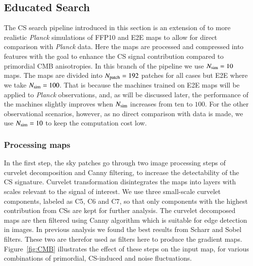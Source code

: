 \documentclass[fleqn,usenatbib]{mnras}
\begin{document}
\subsection{Educated Search}
\label{sec:edu}

 The CS search pipeline introduced in this section is an extension of \cite{vaf17,vafaei2021clustering} to more realistic {\it Planck} simulations of FFP10 and E2E maps to allow for direct comparison with {\it Planck} data. 
 Here the maps are processed and  compressed into features with the goal to  enhance the CS signal contribution compared to primordial CMB anisotropies. 
In this branch of the pipeline we use $N_{\rm sim}=10$ maps.
 The maps are divided into $N_{\rm patch}=192$ patches for all cases but E2E where we take $N_{\rm sim}=100$. 
That is because the machines trained on E2E maps will be applied to {\it Planck} observations, and,  as will be discussed later,  the performance of the machines  slightly improves when $N_{\rm sim}$ increases from ten to $100$. 
For the other observational scenarios, however, as no direct comparison with data is made, we use $N_{\rm sim}=10$ to keep the computation cost low.

\subsubsection{Processing maps}

In the first step, the sky patches go through two image processing steps of curvelet decomposition
\citep{don00,can00,can01,can02,can06} and Canny filtering\citep{can86},  to increase the detectability of the CS signature. 
Curvelet transformation disintegrates the maps into layers with scales relevant to the signal of interest. We use three small-scale curvelet components, labeled as C5, C6 and C7, so that only components with the highest contribution from CSs are kept for further analysis.
%
The curvelet decomposed maps are then filtered using Canny algorithm which is suitable for edge detection in images. In previous analysis we found the best results from Scharr and Sobel filters. These two are therefor used as filters here to produce the gradient maps.
Figure~\ref{fig:CMB} illustrates the effect of these steps on the input map, for various combinations of primordial, CS-induced and noise fluctuations.
\end{document}
